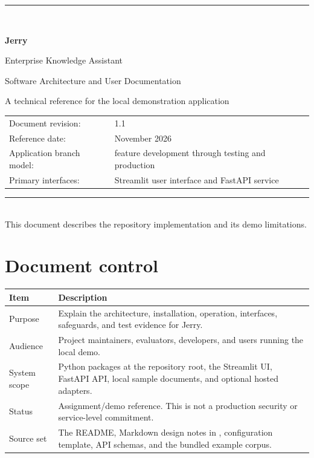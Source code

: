 \documentclass[11pt,a4paper,oneside]{report}
\title{\textcolor{JerryNavy}{\Huge Jerry}\[5pt]
  \Large Enterprise Knowledge Assistant\\[8pt]
  \large Software Architecture and User Documentation}
\author{Jerry Project}
\date{Project reference | November 2026}
\newcommand{\code}[1]{\texttt{\detokenize{#1}}}
\begin{document}
\begin{titlepage}
  \centering
  \vspace*{20mm}
  {\color{JerryBlue}\rule{0.92\textwidth}{2pt}}\\[17mm]
  {\color{JerryNavy}\Huge\bfseries Jerry\par}
  \vspace{5mm}
  {\LARGE Enterprise Knowledge Assistant\par}
  \vspace{4mm}
  {\large Software Architecture and User Documentation\par}
  \vspace{15mm}
  {\large A technical reference for the local demonstration application\par}
  \vfill
  \begin{tabular}{@{}ll@{}}
    Document revision: & 1.1 \\
    Reference date: & November 2026 \\
    Application branch model: & feature development through testing and production \\
    Primary interfaces: & Streamlit user interface and FastAPI service
  \end{tabular}
  \vspace{12mm}
  {\color{JerryBlue}\rule{0.92\textwidth}{1pt}}\\[4mm]
  {\small This document describes the repository implementation and its demo limitations.}
\end{titlepage}

\chapter*{Document control}
\begin{tabularx}{\textwidth}{@{}L{34mm}Y@{}}
\toprule
\textbf{Item} & \textbf{Description} \\
\midrule
Purpose & Explain the architecture, installation, operation, interfaces, safeguards, and test evidence for Jerry. \\
Audience & Project maintainers, evaluators, developers, and users running the local demo. \\
System scope & Python packages at the repository root, the Streamlit UI, FastAPI API, local sample documents, and optional hosted adapters. \\
Status & Assignment/demo reference. This is not a production security or service-level commitment. \\
Source set & The README, Markdown design notes in \code{docs/}, configuration template, API schemas, and the bundled example corpus. \\
\bottomrule
\end{tabularx}
\end{document}
